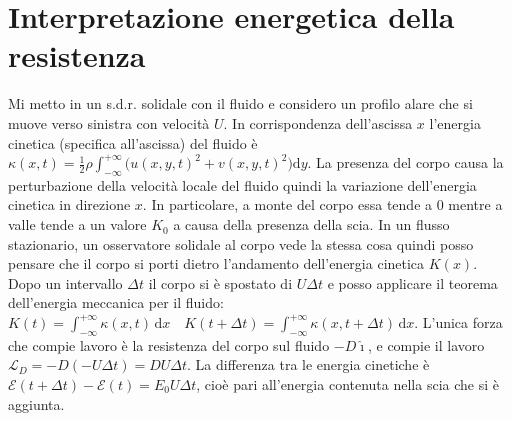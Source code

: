 \documentclass[11pt,a4paper]{report}
\newcommand{\de}{\mathrm d}
\begin{document}
{	\section{Interpretazione energetica della resistenza}
	Mi metto in un s.d.r. solidale con il fluido e considero un profilo alare che si muove verso sinistra con velocità $U$. In corrispondenza dell'ascissa $x$ l'energia cinetica (specifica all'ascissa) del fluido è $\kappa(x,t)=\frac 12\rho\int_{-\infty}^{+\infty}\big(u(x,y,t)^2+v(x,y,t)^2\big)\de y$. La presenza del corpo causa la perturbazione della velocità locale del fluido quindi la variazione dell'energia cinetica in direzione $x$. In particolare, a monte del corpo essa tende a $0$ mentre a valle tende a un valore $K_0$ a causa della presenza della scia. In un flusso stazionario, un osservatore solidale al corpo vede la stessa cosa quindi posso pensare che il corpo si porti dietro l'andamento dell'energia cinetica $K(x)$. Dopo un intervallo $\Delta t$ il corpo si è spostato di $U\Delta t$ e posso applicare il teorema dell'energia meccanica per il fluido: $K(t)=\int_{-\infty}^{+\infty}\kappa(x,t)\,\de x\quad K(t+\Delta t)=\int_{-\infty}^{+\infty}\kappa(x,t+\Delta t)\,\de x$. L'unica forza che compie lavoro è la resistenza del corpo sul fluido $-D\hat\imath$, e compie il lavoro $\mathscr L_D =-D(-U\Delta t)=DU\Delta t$. La differenza tra le energia cinetiche è $\mathcal E(t+\Delta t)-\mathcal E(t)=E_0U\Delta t$, cioè pari all'energia contenuta nella scia che si è aggiunta.}\\\mbox{}\\
\end{document}
